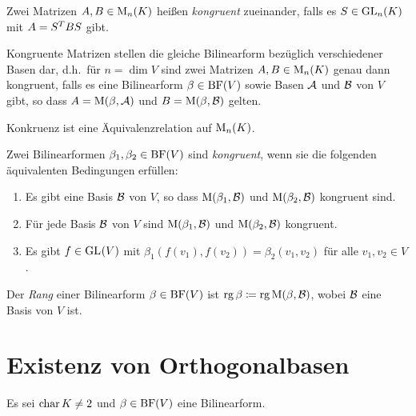 \begin{definition}
  Zwei Matrizen $A, B \in \operatorname{M}_{n}(K)$ heißen \emph{kongruent} zueinander, falls es $S \in \operatorname{GL}_{n}(K)$ mit $A = S^T B S$ gibt.
\end{definition}

Kongruente Matrizen stellen die gleiche Bilinearform bezüglich verschiedener Basen dar, d.h.\ für $n = \dim V$ sind zwei Matrizen $A, B \in \operatorname{M}_{n}(K)$ genau dann kongruent, falls es eine Bilinearform $\beta \in \operatorname{BF}(V)$ sowie Basen $\mathcal{A}$ und $\mathcal{B}$ von $V$ gibt, so dass $A = \operatorname{M}(\beta, \mathcal{A})$ und $B = \operatorname{M}(\beta, \mathcal{B})$ gelten.

\begin{corollary}
  Konkruenz ist eine Äquivalenzrelation auf $\operatorname{M}_{n}(K)$.
\end{corollary}

\begin{definition}
  Zwei Bilinearformen $\beta_1, \beta_2 \in \operatorname{BF}(V)$ sind \emph{kongruent}, wenn sie die folgenden äquivalenten Bedingungen erfüllen:
  \begin{enumerate}
    \item
      Es gibt eine Basis $\mathcal{B}$ von $V$, so dass $\operatorname{M}(\beta_1, \mathcal{B})$ und $\operatorname{M}(\beta_2, \mathcal{B})$ kongruent sind.
    \item
      Für jede Basis $\mathcal{B}$ von $V$ sind $\operatorname{M}(\beta_1, \mathcal{B})$ und $\operatorname{M}(\beta_2, \mathcal{B})$ kongruent.
    \item
      Es gibt $f \in \operatorname{GL}_{}(V)$ mit $\beta_1( f(v_1), f(v_2) ) = \beta_2( v_1, v_2 )$ für alle $v_1, v_2 \in V$.
  \end{enumerate}
\end{definition}

\begin{definition}
  Der \emph{Rang} einer Bilinearform $\beta \in \operatorname{BF}(V)$ ist $\operatorname{rg} \beta \coloneqq \operatorname{rg} \operatorname{M}(\beta, \mathcal{B})$, wobei $\mathcal{B}$ eine Basis von $V$ ist.
\end{definition}





\section{Existenz von Orthogonalbasen}

Es sei $\operatorname{char} K \neq 2$ und $\beta \in \operatorname{BF}(V)$ eine Bilinearform.

